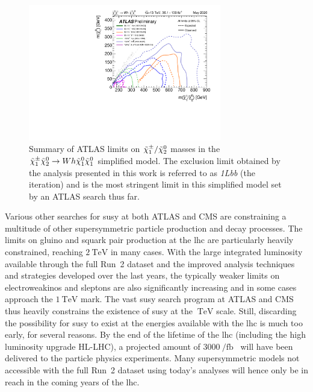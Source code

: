  \begin{figure}
	\centering\includegraphics[width=0.75\textwidth]{fig_15}
	\caption{Summary of ATLAS limits on $\tilde{\chi}_1^\pm/\tilde{\chi}_2^0$ masses in the $\tilde{\chi}_1^\pm\tilde{\chi}_2^0\rightarrow Wh\tilde{\chi}_1^0\tilde{\chi}_1^0$ simplified model. The exclusion limit obtained by the analysis presented in this work is referred to as \textit{1Lbb} (the \onethirtynineifb iteration) and is the most stringent limit in this simplified model set by an ATLAS search thus far.}
	\label{fig:result_wh_summary}
\end{figure}

Various other searches for \gls{susy} at both ATLAS and CMS are constraining a multitude of other supersymmetric particle production and decay processes. The limits on gluino and squark pair production at the \gls{lhc} are particularly heavily constrained, reaching $\SI{2}{\TeV}$ in many cases. With the large integrated luminosity available through the full Run~2 dataset and the improved analysis techniques and strategies developed over the last years, the typically weaker limits on electroweakinos and sleptons are also significantly increasing and in some cases approach the $\SI{1}{\TeV}$ mark. The vast \gls{susy} search program at ATLAS and CMS thus heavily constrains the existence of \gls{susy} at the $\SI{}{\TeV}$ scale. 
Still, discarding the possibility for \gls{susy} to exist at the energies available with the \gls{lhc} is much too early, for several reasons. By the end of the lifetime of the \gls{lhc} (including the high luminosity upgrade HL-LHC), a projected amount of $\SI{3000}{\per\femto\barn}$~\cite{Apollinari:2116337} will have been delivered to the particle physics experiments. 
Many supersymmetric models not accessible with the full Run~2 dataset using today's analyses will hence only be in reach in the coming years of the \gls{lhc}.

